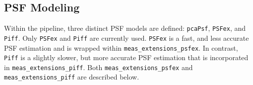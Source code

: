 \subsection{PSF Modeling}

Within the pipeline, three distinct PSF models are defined:  \texttt{pcaPsf}, \texttt{PSFex}, and \texttt{Piff}.
Only \texttt{PSFex} and \texttt{Piff} are currently used.
\texttt{PSFex} is a fast, and less accurate PSF estimation and is wrapped within \texttt{meas\_extensions\_psfex}.
In contrast, \texttt{Piff} is a slightly slower, but more accurate PSF estimation that is incorporated in \texttt{meas\_extensions\_piff}. Both \texttt{meas\_extensions\_psfex} and \texttt{meas\_extensions\_piff} are described below.




